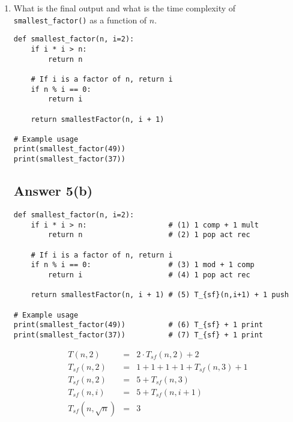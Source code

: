 \documentclass{article}
\begin{document}
\begin{enumerate}[label=(\alph*)]
\begin{equation*}
  \boxed{T(n) = \text{ amortized } \log n}
\end{equation*}

Output:

\begin{verbatim}
  [1, 2, 4, 8, 16, 32, 64, 128, 256, 512]
\end{verbatim}


\item What is the final output and what is the time complexity of
  \verb|smallest_factor()| as a function of $n$.
  
\begin{verbatim}
def smallest_factor(n, i=2):
    if i * i > n:
        return n
    
    # If i is a factor of n, return i
    if n % i == 0:
        return i
    
    return smallestFactor(n, i + 1)

# Example usage
print(smallest_factor(49)) 
print(smallest_factor(37))
\end{verbatim}

\subsection*{Answer 5(b)}

\begin{verbatim}
def smallest_factor(n, i=2):
    if i * i > n:                   # (1) 1 comp + 1 mult
        return n                    # (2) 1 pop act rec
    
    # If i is a factor of n, return i 
    if n % i == 0:                  # (3) 1 mod + 1 comp
        return i                    # (4) 1 pop act rec
    
    return smallestFactor(n, i + 1) # (5) T_{sf}(n,i+1) + 1 push 

# Example usage
print(smallest_factor(49))          # (6) T_{sf} + 1 print
print(smallest_factor(37))          # (7) T_{sf} + 1 print
\end{verbatim}

\begin{eqnarray*}
  T(n,2) &=& 2 \cdot T_{sf}(n, 2) + 2\\
  T_{sf}(n,2) &=& 1 + 1 + 1 + 1 + T_{sf}(n, 3) + 1 \\
  T_{sf}(n,2) &=& 5 + T_{sf}(n, 3) \\
  T_{sf}(n,i) &=& 5 + T_{sf}(n, i+1) \\
  T_{sf}(n, \sqrt{n}) &=& 3
\end{eqnarray*}


\end{enumerate}
\end{document}
